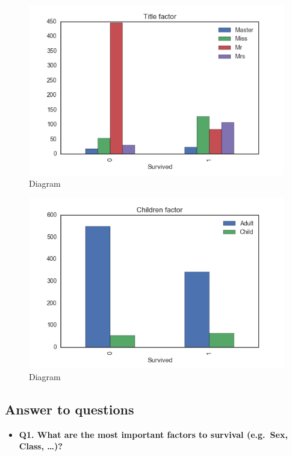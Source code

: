\documentclass[11pt]{article}
\makeatletter
\def\maxwidth{\ifdim\Gin@nat@width>\linewidth\linewidth
    \else\Gin@nat@width\fi}
\let\Oldincludegraphics\includegraphics
\renewcommand{\includegraphics}[1]{\Oldincludegraphics[width=.8\maxwidth]{#1}}
\providecommand{\tightlist}{%
      \setlength{\itemsep}{0pt}\setlength{\parskip}{0pt}}
\makeatother
\begin{document}
    \begin{figure}
\centering
\includegraphics{TitleFactor.png}
\caption{Diagram}
\end{figure}

    \begin{figure}
\centering
\includegraphics{ChildFactorv2.png}
\caption{Diagram}
\end{figure}

    \subsection{Answer to questions}\label{answer-to-questions}

    \begin{itemize}
\tightlist
\item
  \textbf{Q1. What are the most important factors to survival (e.g.~Sex,
  Class, \ldots{})?}
\end{itemize}
\end{document}
